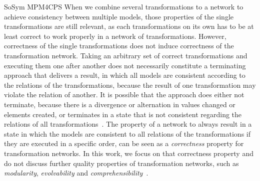\begin{copiedFrom}{SoSym MPM4CPS}
When we combine several transformations to a network to achieve consistency between multiple models, those properties of the single transformations are still relevant, as each transformations on its own has to be at least correct to work properly in a network of transformations.
However, correctness of the single transformations does not induce correctness of the transformation network.
Taking an arbitrary set of correct transformations and executing them one after another does not necessarily constitute a terminating approach that delivers a result, in which all models are consistent according to the relations of the transformations, because the result of one transformation may violate the relation of another.
It is possible that the approach does either not terminate, because there is a divergence or alternation in values changed or elements created, or terminates in a state that is not consistent regarding the relations of all transformations~\cite{klare2019icmt}.
The property of a network to always result in a state in which the models are consistent to all relations of the transformations if they are executed in a specific order, can be seen as a \emph{correctness} property for transformation networks.
In this work, we focus on that correctness property and do not discuss further quality properties of transformation networks, such as \emph{modularity}, \emph{evolvability} and \emph{comprehensibility}~\cite{klare2018docsym}.



\end{copiedFrom}
